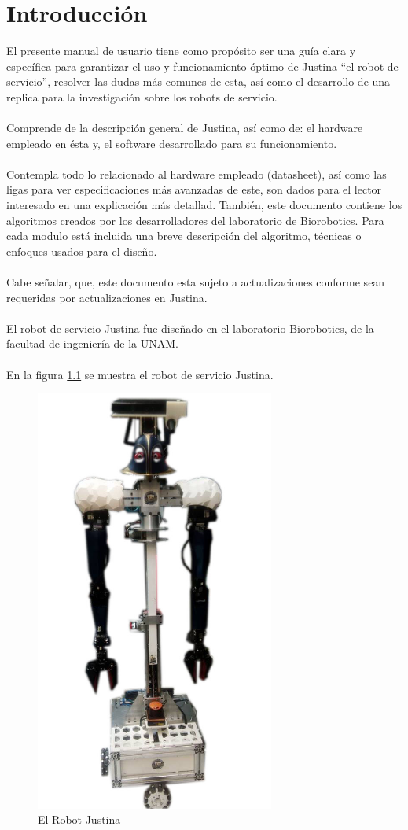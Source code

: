 \documentclass[user_manual.tex]{subfiles}
\begin{document}
\chapter{Introducción}

El presente manual de usuario tiene como propósito ser una guía clara y específica para garantizar el uso y funcionamiento
óptimo de Justina ``el robot de servicio'', resolver las dudas más comunes de esta, así como el desarrollo de una replica
para la investigación sobre los robots de servicio.\\
\\
Comprende de la descripción general de Justina, así como de: el hardware empleado en ésta y, el software desarrollado para su
funcionamiento.\\
\\
Contempla todo lo relacionado al hardware empleado (datasheet), así como las ligas para ver especificaciones más avanzadas de 
este, son dados para el lector interesado en una explicación más detallad. También, este documento contiene los algoritmos
creados por los desarrolladores del laboratorio de Biorobotics. Para cada modulo está incluida una breve descripción del algoritmo,
técnicas o enfoques usados para el diseño.\\
\\
Cabe señalar, que, este documento esta sujeto a actualizaciones conforme sean requeridas por actualizaciones en Justina.\\
\\
El robot de servicio Justina fue diseñado en el laboratorio Biorobotics, de la facultad de ingeniería de la UNAM.\\
\\
En la figura \ref{fig:introduction:Justina} se muestra el robot de servicio Justina.

\begin{figure}[H]
\centering
\includegraphics[width=0.7\textwidth]{Figures/Introduction/Justina.png}
\caption{El Robot Justina}
\label{fig:introduction:Justina}
\end{figure}
\pagebreak
\end{document}

